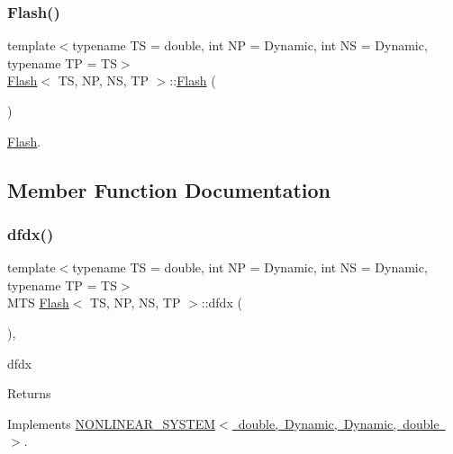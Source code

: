 \subsubsection{\texorpdfstring{Flash()}{Flash()}}
{\footnotesize\ttfamily template$<$typename TS = double, int NP = Dynamic, int NS = Dynamic, typename TP = TS$>$ \\
\mbox{\hyperlink{class_flash}{Flash}}$<$ TS, NP, NS, TP $>$\+::\mbox{\hyperlink{class_flash}{Flash}} (\begin{DoxyParamCaption}{ }\end{DoxyParamCaption})\hspace{0.3cm}{\ttfamily [inline]}}



\mbox{\hyperlink{class_flash}{Flash}}. 



\subsection{Member Function Documentation}
\mbox{\label{class_flash_a83e35b3ab13b3705f0fe06c40b800a8b}} 
\subsubsection{\texorpdfstring{dfdx()}{dfdx()}}
{\footnotesize\ttfamily template$<$typename TS = double, int NP = Dynamic, int NS = Dynamic, typename TP = TS$>$ \\
M\+TS \mbox{\hyperlink{class_flash}{Flash}}$<$ TS, NP, NS, TP $>$\+::dfdx (\begin{DoxyParamCaption}{ }\end{DoxyParamCaption})\hspace{0.3cm}{\ttfamily [inline]}, {\ttfamily [virtual]}}



dfdx 

\begin{DoxyReturn}{Returns}

\end{DoxyReturn}


Implements \mbox{\hyperlink{class_n_o_n_l_i_n_e_a_r___s_y_s_t_e_m_a531f56bcbc77f2219164af40aa16fad2}{N\+O\+N\+L\+I\+N\+E\+A\+R\+\_\+\+S\+Y\+S\+T\+E\+M$<$ double, Dynamic, Dynamic, double $>$}}.

\mbox{\label{class_flash_ad29e755877ca96aa5b9f34a10d6cd8b2}} 
